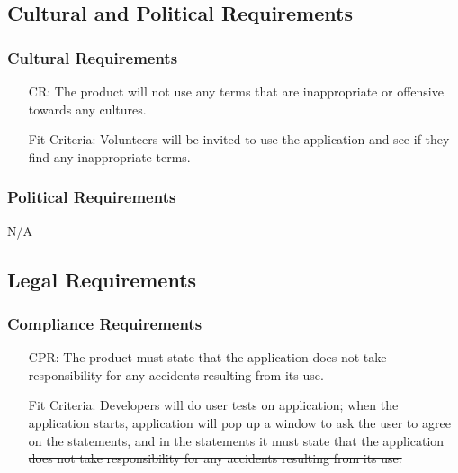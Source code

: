 \documentclass[12pt]{article}
\newcounter{reqnum} %
\newcounter{crreqnum} %
\newcounter{cprreqnum} %
\begin{document}
\subsection{Cultural and Political Requirements}
\subsubsection{Cultural Requirements}
\begin{itemize}
    \item[CR\refstepcounter{crreqnum}\thecrreqnum \label{R_Inputs}:] The product will not use any terms that are inappropriate or offensive towards any cultures.
    \item[] Fit Criteria: Volunteers will be invited to use the application and see if they find any inappropriate terms.
\end{itemize}

\subsubsection{Political Requirements}
N/A

\subsection{Legal Requirements}
\subsubsection{Compliance Requirements}
\begin{itemize}
    \item[CPR\refstepcounter{cprreqnum}\thecprreqnum \label{R_Inputs}:] The product must state that the application does not take responsibility for any accidents resulting from its use. 
    \item[]\sout{ Fit Criteria: Developers will do user tests on application; when the application starts, application will pop up a window to ask the user to agree on the statements, and in the statements it must state that the application does not take responsibility for any accidents resulting from its use.}
\end{itemize}
\end{document}

